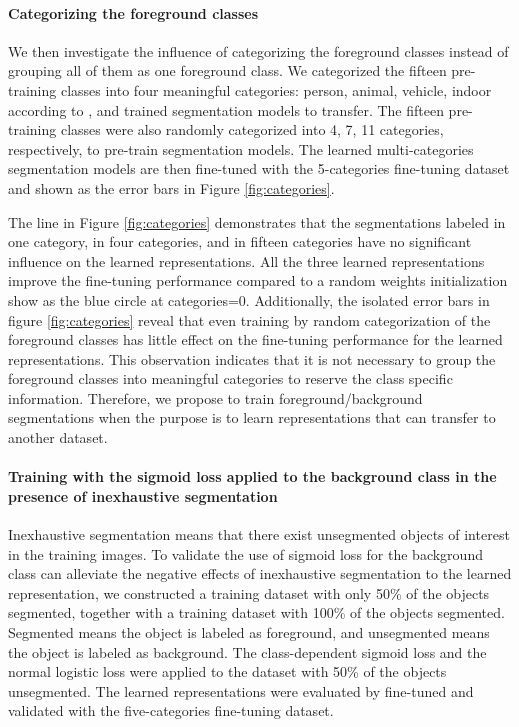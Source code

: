 \paragraph{Categorizing the foreground classes}
We then investigate the influence of categorizing the foreground classes instead of grouping all of them as one foreground class.
We categorized the fifteen pre-training classes into four meaningful categories: person, animal, vehicle, indoor according to \cite{everingham2015pascal}, and trained segmentation models to transfer.
The fifteen pre-training classes were also randomly categorized into 4, 7, 11 categories, respectively, to pre-train segmentation models.
The learned multi-categories segmentation models are then fine-tuned with the 5-categories fine-tuning dataset and shown as the error bars in Figure \ref{fig:categories}.

The line in Figure \ref{fig:categories} demonstrates that the segmentations labeled in one category, in four categories, and in fifteen categories have no significant influence on the learned representations.
All the three learned representations improve the fine-tuning performance compared to a random weights initialization show as the blue circle at categories=0.
Additionally, the isolated error bars in figure \ref{fig:categories} reveal that even training by random categorization of the foreground classes has little effect on the fine-tuning performance for the learned representations.
This observation indicates that it is not necessary to group the foreground classes into meaningful categories to reserve the class specific information.
Therefore, we propose to train foreground/background segmentations when the purpose is to learn representations that can transfer to another dataset.

\paragraph{Training with the sigmoid loss applied to the background class in the presence of inexhaustive segmentation}
Inexhaustive segmentation means that there exist unsegmented objects of interest in the training images.
To validate the use of sigmoid loss for the background class can alleviate the negative effects of inexhaustive segmentation to the learned representation, we constructed a training dataset with only 50\% of the objects segmented, together with a training dataset with 100\% of the objects segmented.
Segmented means the object is labeled as foreground, and unsegmented means the object is labeled as background.
The class-dependent sigmoid loss and the normal logistic loss were applied to the dataset with 50\% of the objects unsegmented.
The learned representations were evaluated by fine-tuned and validated with the five-categories fine-tuning dataset.

